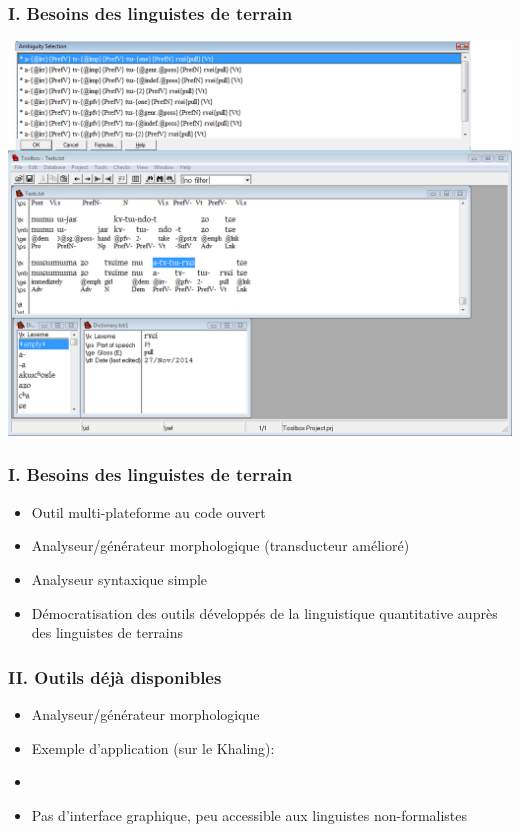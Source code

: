 \documentclass[xcolor=table]{beamer}
\begin{document}
 \begin{frame} 
 \frametitle{I. Besoins des linguistes de terrain}
 \includegraphics[width=\textwidth]{toolbox-ex.png}
\end{frame}
 \begin{frame} 
 \frametitle{I. Besoins des linguistes de terrain}
 \begin{itemize}
 \item Outil multi-plateforme au code ouvert
 \item Analyseur/générateur morphologique (transducteur amélioré)
 \item Analyseur syntaxique simple
 \item Démocratisation des outils développés de la linguistique quantitative auprès des linguistes de terrains
  \end{itemize}
\end{frame}


 \begin{frame} 
 \frametitle{II. Outils déjà disponibles}
     
 \begin{itemize}
 \item Analyseur/générateur morphologique 
 \item Exemple d'application (sur le Khaling):
 \item {}
 \item Pas d'interface graphique, peu accessible aux linguistes non-formalistes
  \end{itemize} 
\end{frame}
\end{document}

